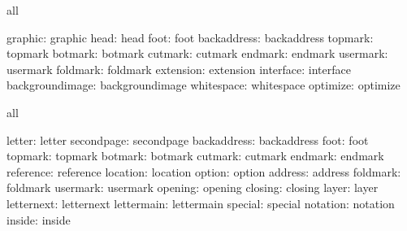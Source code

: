 



\unprotect


\startconstants            all

                  graphic: graphic
                     head: head
                     foot: foot
              backaddress: backaddress
                  topmark: topmark
                  botmark: botmark
                  cutmark: cutmark
                  endmark: endmark
                 usermark: usermark
                 foldmark: foldmark
                extension: extension
                interface: interface
          backgroundimage: backgroundimage
               whitespace: whitespace
                 optimize: optimize
\stopconstants

\startvariables            all

                   letter: letter
               secondpage: secondpage
              backaddress: backaddress
                     foot: foot
                  topmark: topmark
                  botmark: botmark
                  cutmark: cutmark
                  endmark: endmark
                reference: reference
                 location: location
                   option: option
                  address: address
                 foldmark: foldmark
                 usermark: usermark
                  opening: opening
                  closing: closing
                    layer: layer
               letternext: letternext
               lettermain: lettermain
                  special: special
                 notation: notation
                   inside: inside
\stopvariables


\def\????ld{@@@@ld} %
\def\????ls{@@@@ls} %
\def\????lv{@@@@lv} %

